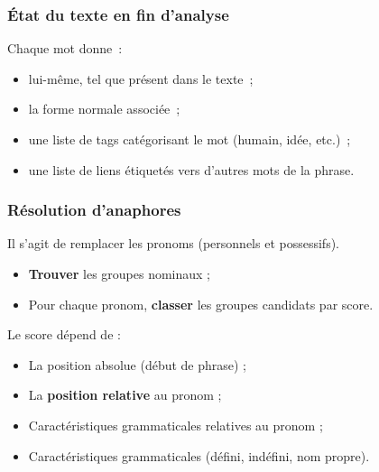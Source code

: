 \documentclass[12pt, handout]{beamer}
\begin{document}
\begin{frame}
 \frametitle{État du texte en fin d'analyse}
 Chaque mot donne~:
 \begin{itemize}
  \item lui-même, tel que présent dans le texte~;
  \item la forme normale associée~;
  \item une liste de tags catégorisant le mot (humain, idée, etc.)~;
  \item une liste de liens étiquetés vers d'autres mots de la phrase.
 \end{itemize}
 
 
\end{frame}


\begin{frame}
 \frametitle{Résolution d'anaphores}
 
 Il s'agit de remplacer les pronoms (personnels et possessifs).
 
  \begin{itemize}
   \item \textbf{Trouver} les groupes nominaux ;
   \item Pour chaque pronom, \textbf{classer} les groupes candidats par score.
  \end{itemize}

  \pause
  
  Le score dépend de :
  \begin{itemize}
   \item La position absolue (début de phrase) ;
   \item La \textbf{position relative} au pronom ;
   \item Caractéristiques grammaticales relatives au pronom ;
   \item Caractéristiques grammaticales (défini, indéfini, nom propre).
  \end{itemize}

 
 
\end{frame}
\end{document}
